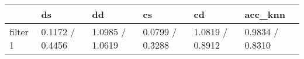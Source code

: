 \begin{tabular}{llllll}
\toprule
{} &               ds &               dd &               cs &               cd &          acc\_knn \\
\midrule
filter 1 &  0.1172 / 0.4456 &  1.0985 / 1.0619 &  0.0799 / 0.3288 &  1.0819 / 0.8912 &  0.9834 / 0.8310 \\
\bottomrule
\end{tabular}
